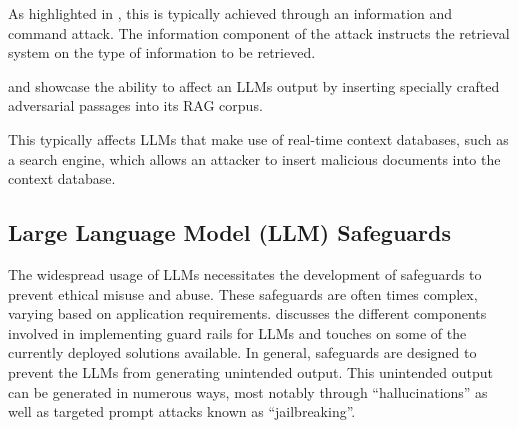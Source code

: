 As highlighted in \autocite{zeng2024goodbadexploringprivacy}, this is typically achieved through an information and command attack.
The information component of the attack instructs the retrieval system on the type of information to be retrieved.




\autocite{tan2024gluepizzaeatrocks} and \autocite{xue2024badragidentifyingvulnerabilitiesretrieval} showcase the ability to affect an LLMs output by inserting specially crafted adversarial passages into its RAG corpus.

This typically affects LLMs that make use of real-time context databases, such as a search engine, which allows an attacker to insert malicious documents into the context database.

\subsection{Large Language Model (LLM) Safeguards}
The widespread usage of LLMs necessitates the development of safeguards to prevent ethical misuse and abuse.
These safeguards are often times complex, varying based on application requirements.
\autocite{dong2024buildingguardrailslargelanguage} discusses the different components involved in implementing guard rails for LLMs and touches on some of the currently deployed solutions available.
In general, safeguards are designed to prevent the LLMs from generating unintended output.
This unintended output can be generated in numerous ways, most notably through ``hallucinations'' as well as targeted prompt attacks known as ``jailbreaking''.
